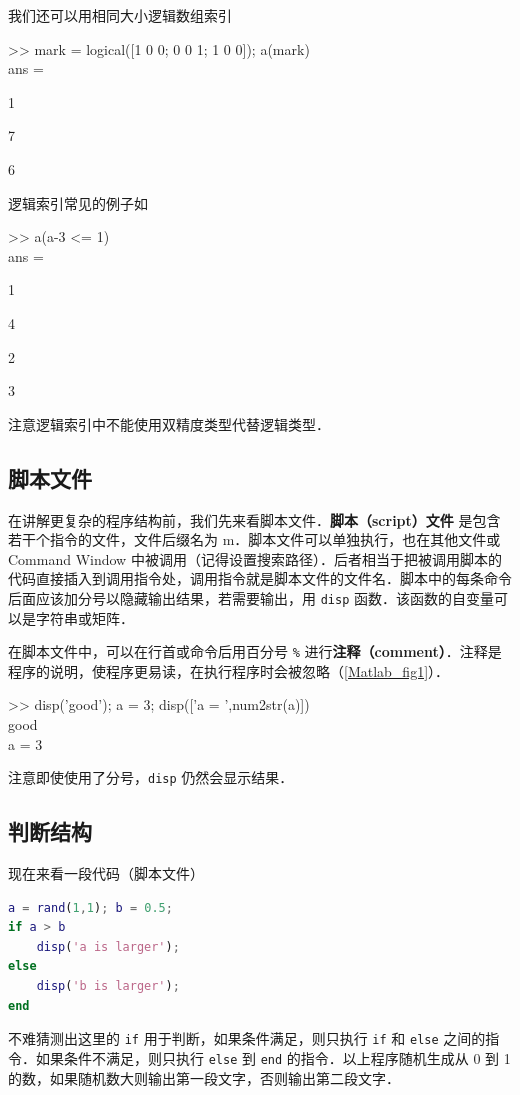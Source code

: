 我们还可以用相同大小逻辑数组索引
\begin{Command}
>> mark = logical([1 0 0; 0 0 1; 1 0 0]); a(mark) \\
ans = \par 1 \par 7 \par 6
\end{Command}
逻辑索引常见的例子如
\begin{Command}
>> a(a-3 <= 1) \\
ans = \par 1 \par 4 \par 2 \par 3
\end{Command}
注意逻辑索引中不能使用双精度类型代替逻辑类型．

\subsection{脚本文件}
在讲解更复杂的程序结构前，我们先来看脚本文件．\textbf{脚本（script）文件} 是包含若干个指令的文件，文件后缀名为 m．脚本文件可以单独执行，也在其他文件或 Command Window 中被调用（记得设置搜索路径）．后者相当于把被调用脚本的代码直接插入到调用指令处，调用指令就是脚本文件的文件名．脚本中的每条命令后面应该加分号以隐藏输出结果，若需要输出，用 \texttt{disp} 函数．该函数的自变量可以是字符串或矩阵．

在脚本文件中，可以在行首或命令后用百分号 \texttt{\%} 进行\textbf{注释（comment）}．注释是程序的说明，使程序更易读，在执行程序时会被忽略（\autoref{Matlab_fig1}）．
\begin{Command}
>> disp('good'); a = 3; disp(['a = ',num2str(a)]) \\
good \\
a = 3
\end{Command}
注意即使使用了分号，\texttt{disp} 仍然会显示结果．

\subsection{判断结构}
现在来看一段代码（脚本文件）
\begin{lstlisting}[language=Matlab]
a = rand(1,1); b = 0.5;
if a > b
    disp('a is larger');
else
    disp('b is larger');
end
\end{lstlisting}
不难猜测出这里的 \texttt{if} 用于判断，如果条件满足，则只执行 \texttt{if} 和 \texttt{else} 之间的指令．如果条件不满足，则只执行 \texttt{else} 到 \texttt{end} 的指令．以上程序随机生成从 0 到 1 的数，如果随机数大则输出第一段文字，否则输出第二段文字．

